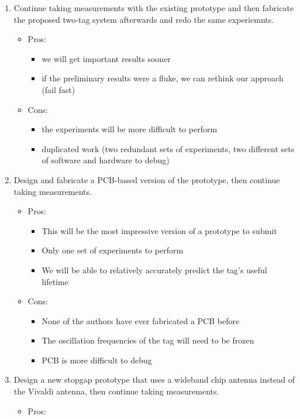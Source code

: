 \documentclass[12pt]{article}
\begin{document}
\begin{enumerate}
\item Continue taking measurements with the existing prototype and
  then fabricate the proposed two-tag system afterwards and redo the
  same experiemnts.
\begin{itemize}
\item Pros: 
\begin{itemize}
\item we will get important results sooner
\item if the preliminary results were a fluke, we can rethink our approach (fail fast)
\end{itemize}
\item Cons:
\begin{itemize}
\item the experiments will be more difficult to perform
\item duplicated work (two redundant sets of experiments, two
  different sets of software and hardware to debug)
\end{itemize}
\end{itemize}
\item Design and fabricate a PCB-based version of the prototype, then
  continue taking measurements.
\begin{itemize}
\item Pros:
\begin{itemize}
\item This will be the most impressive version of a prototype to submit
\item Only one set of experiments to perform
\item We will be able to relatively accurately predict the tag's useful lifetime
\end{itemize}
\item Cons:
\begin{itemize}
\item None of the authors have ever fabricated a PCB before
\item The oscillation frequencies of the tag will need to be frozen
\item PCB is more difficult to debug
\end{itemize}
\end{itemize}
\item Design a new stopgap prototype that uses a wideband chip antenna
  instead of the Vivaldi antenna, then continue taking measurements.
\begin{itemize}
\item Pros: 

\end{itemize}
\end{enumerate}
\end{document}
